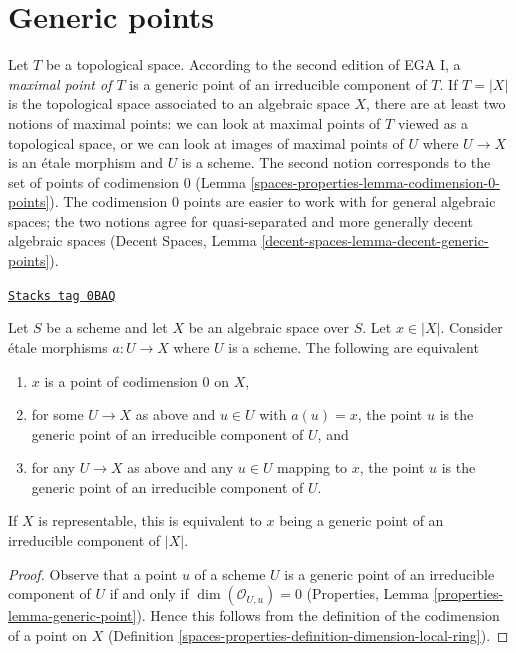 \section{Generic points}
\label{spaces-properties-section-generic-points}
Let $T$ be a topological space. According to the second edition of
EGA I, a {\it maximal point of $T$} is a generic point of an irreducible
component of $T$. If $T = |X|$ is the topological space associated to
an algebraic space $X$, there are at least two notions of maximal points:
we can look at maximal points of $T$ viewed as a topological space, or
we can look at images of maximal points of $U$ where $U \to X$ is an
\'etale morphism and $U$ is a scheme. The second notion corresponds to
the set of points of codimension $0$ (Lemma \ref{spaces-properties-lemma-codimension-0-points}).
The codimension $0$ points are easier
to work with for general algebraic spaces; the two notions
agree for quasi-separated and more generally decent algebraic spaces
(Decent Spaces, Lemma \ref{decent-spaces-lemma-decent-generic-points}).

\begin{lemma}
\label{spaces-properties-lemma-codimension-0-points}
\href{https://stacks.math.columbia.edu/tag/0BAQ}{\texttt{Stacks tag 0BAQ}}

Let $S$ be a scheme and let $X$ be an algebraic space over $S$.
Let $x \in |X|$. Consider \'etale morphisms $a : U \to X$ where
$U$ is a scheme. The following are equivalent
\begin{enumerate}
\item $x$ is a point of codimension $0$ on $X$,
\item for some $U \to X$ as above and $u \in U$ with $a(u) = x$,
the point $u$ is the generic point of an irreducible component of $U$, and
\item for any $U \to X$ as above and any $u \in U$ mapping to $x$,
the point $u$ is the generic point of an irreducible component of $U$.
\end{enumerate}
If $X$ is representable, this is equivalent to $x$ being a generic
point of an irreducible component of $|X|$.
\end{lemma}

\begin{proof}
Observe that a point $u$ of a scheme $U$ is a generic point of an
irreducible component of $U$ if and only if $\dim(\mathcal{O}_{U, u}) = 0$
(Properties, Lemma \ref{properties-lemma-generic-point}).
Hence this follows from the definition of the codimension of a
point on $X$ (Definition \ref{spaces-properties-definition-dimension-local-ring}).
\end{proof}

